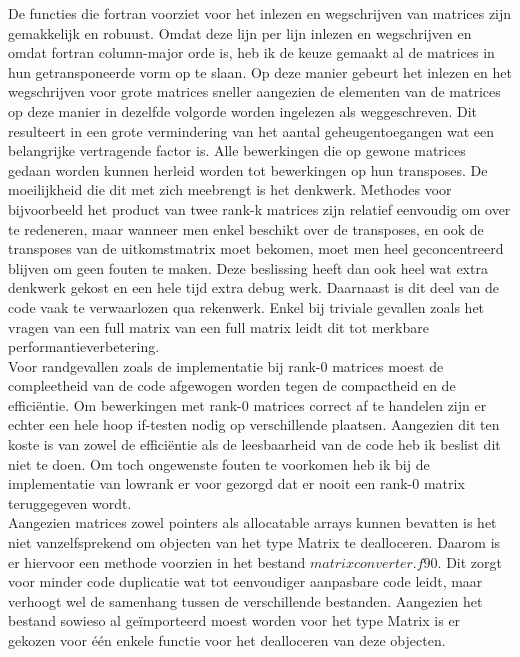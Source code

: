 \documentclass[a4paper]{article}
\begin{document}
De functies die fortran voorziet voor het inlezen en wegschrijven van matrices zijn gemakkelijk en robuust. Omdat deze lijn per lijn inlezen en wegschrijven en omdat fortran column-major orde is, heb ik de keuze gemaakt al de matrices in hun getransponeerde vorm op te slaan. Op deze manier gebeurt het inlezen en het wegschrijven voor grote matrices sneller aangezien de elementen van de matrices op deze manier in dezelfde volgorde worden ingelezen als weggeschreven. Dit resulteert in een grote vermindering van het aantal geheugentoegangen wat een belangrijke vertragende factor is. Alle bewerkingen die op gewone matrices gedaan worden kunnen herleid worden tot bewerkingen op hun transposes. De moeilijkheid die dit met zich meebrengt is het denkwerk. Methodes voor bijvoorbeeld het product van twee rank-k matrices zijn relatief eenvoudig om over te redeneren, maar wanneer men enkel beschikt over de transposes, en ook de transposes van de uitkomstmatrix moet bekomen, moet men heel geconcentreerd blijven om geen fouten te maken. Deze beslissing heeft dan ook heel wat extra denkwerk gekost en een hele tijd extra debug werk. Daarnaast is dit deel van de code vaak te verwaarlozen qua rekenwerk. Enkel bij triviale gevallen zoals het vragen van een full matrix van een full matrix leidt dit tot merkbare performantieverbetering.\\
Voor randgevallen zoals de implementatie bij rank-0 matrices moest de compleetheid van de code afgewogen worden tegen de compactheid en de effici\"entie. Om bewerkingen met rank-0 matrices correct af te handelen zijn er echter een hele hoop if-testen nodig op verschillende plaatsen. Aangezien dit ten koste is van zowel de effici\"entie als de leesbaarheid van de code heb ik beslist dit niet te doen. Om toch ongewenste fouten te voorkomen heb ik bij de implementatie van lowrank er voor gezorgd dat er nooit een rank-0 matrix teruggegeven wordt. \\
Aangezien matrices zowel pointers als allocatable arrays kunnen bevatten is het niet vanzelfsprekend om objecten van het type Matrix te dealloceren. Daarom is er hiervoor een methode voorzien in het bestand \(matrixconverter.f90\). Dit zorgt voor minder code duplicatie wat tot eenvoudiger aanpasbare code leidt, maar verhoogt wel de samenhang tussen de verschillende bestanden. Aangezien het bestand sowieso al ge\"importeerd moest worden voor het type Matrix is er gekozen voor \'e\'en enkele functie voor het dealloceren van deze objecten.
\end{document}
